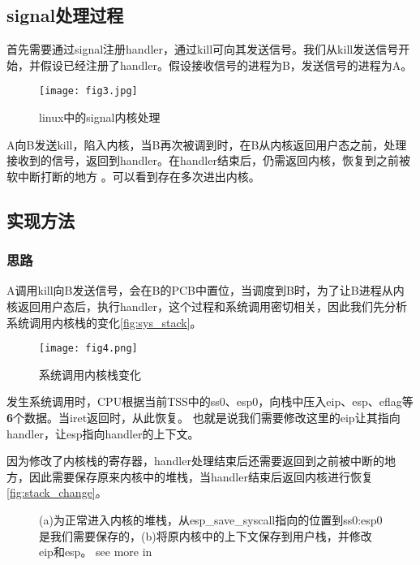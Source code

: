 \documentclass[UTF8]{ctexart}
\begin{document}
\subsection{signal处理过程}

首先需要通过signal注册handler，通过kill可向其发送信号。我们从kill发送信号开始，并假设已经注册了handler。假设接收信号的进程为B，发送信号的进程为A。

\begin{figure}[ht]
    \centering
    \texttt{[image: fig3.jpg]}
    \caption{linux中的signal内核处理\cite{linux-signal-zhihu}}
    \label{fig:signal_linux}
\end{figure}

A向B发送kill，陷入内核，当B再次被调到时，在B从内核返回用户态之前，处理接收到的信号，返回到handler。在handler结束后，仍需返回内核，恢复到之前被软中断打断的地方
\cite{linux-sinal-csdn}\cite{linux-signal-meizu}。可以看到存在多次进出内核。

\subsection{实现方法}

\subsubsection{思路}

A调用kill向B发送信号，会在B的PCB中置位，当调度到B时，为了让B进程从内核返回用户态后，执行handler，这个过程和系统调用密切相关，因此我们先分析系统调用内核栈的变化\autoref{fig:sys_stack}。

\begin{figure}[ht]
    \centering
    \texttt{[image: fig4.png]}
    \caption{系统调用内核栈变化}
    \label{fig:sys_stack}
\end{figure}

发生系统调用时，CPU根据当前TSS中的ss0、esp0，向栈中压入eip、esp、eflag等\textbf{6}个数据\cite{mit}。当iret返回时，从此恢复。
也就是说我们需要修改这里的eip让其指向handler，让esp指向handler的上下文。

因为修改了内核栈的寄存器，handler处理结束后还需要返回到之前被中断的地方，因此需要保存原来内核中的堆栈，当handler结束后返回内核进行恢复\autoref{fig:stack_change}。

\begin{figure}[ht]
    \centering
    \caption{(a)为正常进入内核的堆栈，从esp\_save\_syscall指向的位置到ss0:esp0是我们需要保存的，(b)将原内核中的上下文保存到用户栈，并修改eip和esp。
    see more in \cite{minix-cnblog}
    }
    \label{fig:stack_change}
\end{figure}
\end{document}
